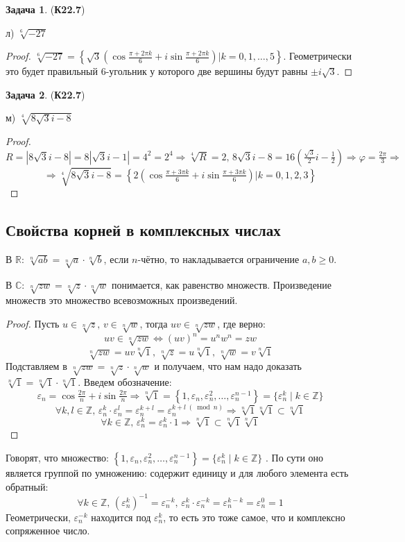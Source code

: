 \documentclass[12pt]{article}
\newcommand{\MR}{\mathbb{R}}
\newcommand{\MC}{\mathbb{C}}
\newcommand{\MZ}{\mathbb{Z}}
\newcommand{\VE}{\varepsilon}
\theoremstyle{definition}
\newtheorem{problem}{Задача}
\begin{document}
\begin{problem}(\textbf{К22.7})
	
	л) $\sqrt[6]{-27}$
\end{problem}
\begin{proof}
	$\sqrt[6]{-27} = \left\{\sqrt{3}\left( \cos\tfrac{\pi + 2\pi k}{6} + i\sin \tfrac{\pi + 2\pi k}{6}\right) \Big\vert k = 0,1,\dotsc, 5\right\}$. Геометрически это будет правильный $6$-угольник у которого две вершины будут равны $\pm i\sqrt{3}$.
\end{proof}

\begin{problem}(\textbf{К22.7})
	
	м) $\sqrt[4]{8\sqrt{3}i - 8}$
\end{problem}
\begin{proof}
	$$
		R = |8\sqrt{3}i - 8| = 8|\sqrt{3}i - 1| = 4^2 = 2^4 \Rightarrow \sqrt[4]{R} = 2, \, 8\sqrt{3}i - 8 = 16\left(\tfrac{\sqrt{3}}{2}i - \tfrac{1}{2}\right) \Rightarrow \varphi = \tfrac{2 \pi}{3} \Rightarrow
	$$
	$$
		\Rightarrow \sqrt[4]{8\sqrt{3}i - 8} = \left\{2 \left(\cos\tfrac{\pi + 3\pi k}{6} + i \sin\tfrac{\pi + 3\pi k}{6} \right) \Big\vert k = 0,1,2,3\right\}
	$$
\end{proof}

\subsection*{Свойства корней в комплексных числах}

В $\MR$: $\sqrt[n]{ab} = \sqrt[n]{a}{\cdot}\sqrt[n]{b}$, если $n$-чётно, то накладывается ограничение $a,b \geq 0$.

В $\MC$: $\sqrt[n]{zw} =\sqrt[n]{z}{\cdot}\sqrt[n]{w}$ понимается, как равенство множеств. Произведение множеств это множество всевозможных произведений.
\begin{proof}
	Пусть $u \in \sqrt[n]{z}, \, v \in \sqrt[n]{w}$, тогда $uv \in \sqrt[n]{zw}$, где верно:
	$$
		uv\in \sqrt[n]{zw} \Leftrightarrow (uv)^n = u^nw^n = zw
	$$
	$$
		\sqrt[n]{zw} = uv\sqrt[n]{1}, \, \sqrt[n]{z} = u \sqrt[n]{1}, \, \sqrt[n]{w} = v\sqrt[n]{1}
	$$
	Подставляем в $\sqrt[n]{zw} =\sqrt[n]{z}{\cdot}\sqrt[n]{w}$ и получаем, что нам надо доказать $\sqrt[n]{1} = \sqrt[n]{1}{\cdot}\sqrt[n]{1}$. Введем обозначение:
	$$
		\VE_n = \cos\tfrac{2\pi}{n} + i \sin\tfrac{2\pi}{n} \Rightarrow \sqrt[n]{1} = \left\{1 ,\VE_n, \VE_n^2,\dotsc, \VE_n^{n-1} \right\} = \{\VE_n^k \mid k \in \MZ \}
	$$
	$$
		\forall k,l \in \MZ, \, \VE_n^k{\cdot}\VE_n^l = \VE_n^{k + l} = \VE_n^{k + l \; (\bmod n)} \Rightarrow \sqrt[n]{1}\sqrt[n]{1} \subset \sqrt[n]{1}
	$$
	$$
		\forall k \in \MZ, \, \VE_n^k = \VE_n^k{\cdot}1 \Rightarrow \sqrt[n]{1} \subset \sqrt[n]{1}\sqrt[n]{1}
	$$
\end{proof}
Говорят, что множество: $\left\{1 ,\VE_n, \VE_n^2,\dotsc, \VE_n^{n-1} \right\} = \{\VE_n^k \mid k \in \MZ \}$ . По сути оно является группой по умножению: содержит единицу и для любого элемента есть обратный: 
$$
	\forall k \in \MZ, \, (\VE_n^k)^{-1} = \VE_n^{-k}, \, \VE_n^k{\cdot} \VE_n^{-k} =  \VE_n^{k - k} = \VE_n^0 = 1
$$ 
Геометрически, $\VE_n^{-k}$ находится под $\VE_n^k$, то есть это тоже самое, что и комплексно сопряженное число.
\end{document}
